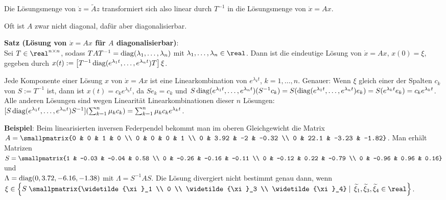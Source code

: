 Die Lösungsmenge von $\dot{z} = \widetilde{A} z$ transformiert sich also linear durch $T^{-1}$
in die Lösungsmenge von $\dot{x} = Ax$.

\linie

Oft ist $A$ zwar nicht diagonal, dafür aber diagonalisierbar.

\textbf{Satz (Lösung von $\dot{x} = Ax$ für $A$ diagonalisierbar)}:\\
Sei $T \in \real^{n \times n}$, sodass
$TAT^{-1} = \operatorname{diag}(\lambda_1, \dotsc, \lambda_n)$
mit $\lambda_1, \dotsc, \lambda_n \in \real$.
Dann ist die eindeutige Lösung von $\dot{x} = Ax$, $x(0) = \xi$, gegeben durch
$x(t) := \left[T^{-1} \operatorname{diag}(e^{\lambda_1 t}, \dotsc, e^{\lambda_n t}) T\right] \xi$.

Jede Komponente einer Lösung $x$ von $\dot{x} = Ax$ ist eine
Linearkombination von $e^{\lambda_k t}$, $k = 1, \dotsc, n$.
Genauer: Wenn $\xi$ gleich einer der Spalten $c_k$ von $S := T^{-1}$ ist,
dann ist $x(t) = c_k e^{\lambda_k t}$,
da
$Se_k = c_k$ und
$S \operatorname{diag}(e^{\lambda_1 t}, \dotsc, e^{\lambda_n t}) (S^{-1} c_k) =
S (\operatorname{diag}(e^{\lambda_1 t}, \dotsc, e^{\lambda_n t}) e_k) = S (e^{\lambda_k t} e_k) =
c_k e^{\lambda_k t}$.\\
Alle anderen Lösungen sind wegen Linearität Linearkombinationen dieser $n$ Lösungen:\\
$[S \operatorname{diag}(e^{\lambda_1 t}, \dotsc, e^{\lambda_n t}) S^{-1}] (\sum_{k=1}^n \mu_k c_k)
= \sum_{k=1}^n \mu_k c_k e^{\lambda_k t}$.

\textbf{Beispiel}:
Beim linearisierten inversen Federpendel bekommt man im oberen Gleichgewicht die Matrix
$A = \smallpmatrix{0 & 0 & 1 & 0 \\ 0 & 0 & 0 & 1 \\
0 & 3.92 & -2 & -0.32 \\ 0 & 22.1 & -3.23 & -1.82}$.
Man erhält Matrizen
$S = \smallpmatrix{1 & -0.03 & -0.04 & 0.58 \\ 0 & -0.26 & -0.16 & -0.11 \\
0 & -0.12 & 0.22 & -0.79 \\ 0 & -0.96 & 0.96 & 0.16}$ und\\
$\Lambda = \operatorname{diag}(0, 3.72, -6.16, -1.38)$ mit $\Lambda = S^{-1} AS$.
Die Lösung divergiert nicht bestimmt genau dann, wenn
$\xi \in \left\{S \left.\smallpmatrix{\widetilde{\xi}_1 \\ 0 \\
\widetilde{\xi}_3 \\ \widetilde{\xi}_4} \;\right|\;
\widetilde{\xi}_1, \widetilde{\xi}_3, \widetilde{\xi}_4 \in \real\right\}$.

